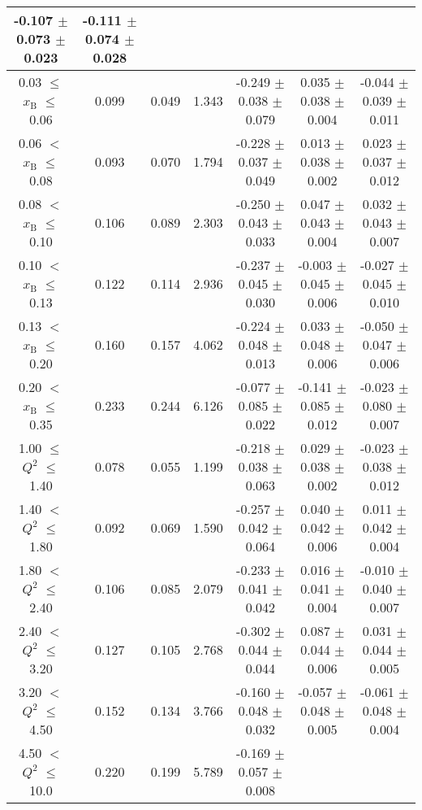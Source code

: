 \begin{table}[width=15cm]
\begin{center}
{\begin{tabular}{|c|c|c|c|c|c|c|}
-0.107  $\pm$  0.073   $\pm$  0.023 & -0.111 $\pm$   0.074  $\pm$   0.028\\
\hline
0.03 $\leqslant$ $x_{\textrm{B}}$ $\leqslant$ 0.06 &  0.099 & 0.049 & 1.343 & -0.249  $\pm$  0.038  $\pm$   0.079 &
0.035 $\pm$   0.038  $\pm$   0.004 & -0.044  $\pm$  0.039  $\pm$  0.011 \\ 
0.06 $<$ $x_{\textrm{B}}$ $\leqslant$ 0.08 &  0.093 & 0.070 &  1.794 &  -0.228 $\pm$  0.037  $\pm$   0.049 &
0.013  $\pm$  0.038  $\pm$   0.002 & 0.023 $\pm$   0.037  $\pm$   0.012\\
0.08 $<$ $x_{\textrm{B}}$ $\leqslant$ 0.10 &  0.106 & 0.089 &  2.303 &  -0.250 $\pm$   0.043  $\pm$   0.033 &
0.047 $\pm$   0.043  $\pm$   0.004 & 0.032  $\pm$  0.043  $\pm$   0.007\\
0.10 $<$ $x_{\textrm{B}}$ $\leqslant$ 0.13 &  0.122 &  0.114 &  2.936 &  -0.237 $\pm$   0.045  $\pm$   0.030 &
-0.003  $\pm$  0.045 $\pm$    0.006 & -0.027 $\pm$ 0.045  $\pm$   0.010\\
0.13 $<$ $x_{\textrm{B}}$ $\leqslant$ 0.20 &  0.160 & 0.157 &  4.062 &  -0.224 $\pm$   0.048  $\pm$   0.013 &
0.033  $\pm$  0.048 $\pm$    0.006 & -0.050 $\pm$   0.047  $\pm$   0.006\\
0.20 $<$ $x_{\textrm{B}}$ $\leqslant$ 0.35 &  0.233 & 0.244 &  6.126 &  -0.077  $\pm$  0.085 $\pm$    0.022 &
-0.141  $\pm$  0.085  $\pm$   0.012 & -0.023 $\pm$  0.080 $ \pm$  0.007\\
\hline
1.00 $\leqslant$ $Q^{2}$ $\leqslant$ 1.40 &  0.078 & 0.055  & 1.199  &  -0.218  $\pm$  0.038  $\pm$   0.063 &
0.029 $\pm$   0.038  $\pm$   0.002 & -0.023  $\pm$  0.038  $\pm$   0.012\\
1.40 $<$ $Q^{2}$ $\leqslant$ 1.80 &  0.092 & 0.069 &  1.590  &  -0.257  $\pm$  0.042  $\pm$   0.064 &
0.040 $\pm$  0.042  $\pm$   0.006 & 0.011 $\pm$   0.042  $\pm$   0.004\\
1.80 $<$ $Q^{2}$ $\leqslant$ 2.40 &  0.106 & 0.085 &  2.079  &  -0.233 $\pm$  0.041  $\pm$   0.042 &
0.016 $\pm$   0.041  $\pm$   0.004 & -0.010  $\pm$  0.040  $\pm$   0.007\\
2.40 $<$ $Q^{2}$ $\leqslant$ 3.20 &  0.127 & 0.105  & 2.768  &  -0.302  $\pm$  0.044   $\pm$  0.044 & 
0.087  $\pm$  0.044  $\pm$   0.006 & 0.031  $\pm$  0.044  $\pm$   0.005\\
3.20 $<$ $Q^{2}$ $\leqslant$ 4.50 &  0.152 & 0.134 &  3.766  &  -0.160  $\pm$  0.048  $\pm$   0.032 &
-0.057  $\pm$  0.048  $\pm$   0.005 & -0.061  $\pm$  0.048  $\pm$   0.004 \\
4.50 $<$ $Q^{2}$ $\leqslant$ 10.0 &  0.220 & 0.199 &  5.789  &  -0.169 $\pm$ 0.057  $\pm$   0.008 &

\end{tabular}}
\end{center}
\end{table}
